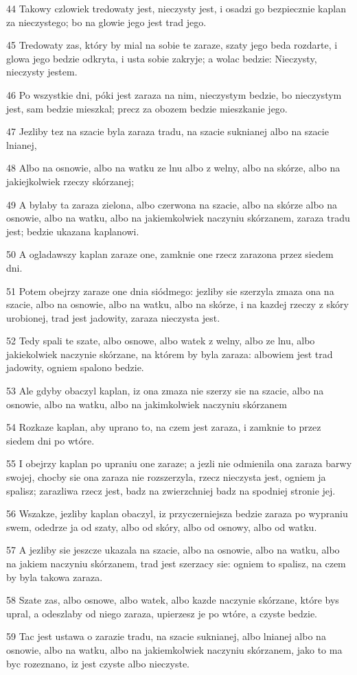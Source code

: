 \par 44 Takowy czlowiek tredowaty jest, nieczysty jest, i osadzi go bezpiecznie kaplan za nieczystego; bo na glowie jego jest trad jego.
\par 45 Tredowaty zas, który by mial na sobie te zaraze, szaty jego beda rozdarte, i glowa jego bedzie odkryta, i usta sobie zakryje; a wolac bedzie: Nieczysty, nieczysty jestem.
\par 46 Po wszystkie dni, póki jest zaraza na nim, nieczystym bedzie, bo nieczystym jest, sam bedzie mieszkal; precz za obozem bedzie mieszkanie jego.
\par 47 Jezliby tez na szacie byla zaraza tradu, na szacie suknianej albo na szacie lnianej,
\par 48 Albo na osnowie, albo na watku ze lnu albo z welny, albo na skórze, albo na jakiejkolwiek rzeczy skórzanej;
\par 49 A bylaby ta zaraza zielona, albo czerwona na szacie, albo na skórze albo na osnowie, albo na watku, albo na jakiemkolwiek naczyniu skórzanem, zaraza tradu jest; bedzie ukazana kaplanowi.
\par 50 A ogladawszy kaplan zaraze one, zamknie one rzecz zarazona przez siedem dni.
\par 51 Potem obejrzy zaraze one dnia siódmego: jezliby sie szerzyla zmaza ona na szacie, albo na osnowie, albo na watku, albo na skórze, i na kazdej rzeczy z skóry urobionej, trad jest jadowity, zaraza nieczysta jest.
\par 52 Tedy spali te szate, albo osnowe, albo watek z welny, albo ze lnu, albo jakiekolwiek naczynie skórzane, na którem by byla zaraza: albowiem jest trad jadowity, ogniem spalono bedzie.
\par 53 Ale gdyby obaczyl kaplan, iz ona zmaza nie szerzy sie na szacie, albo na osnowie, albo na watku, albo na jakimkolwiek naczyniu skórzanem
\par 54 Rozkaze kaplan, aby uprano to, na czem jest zaraza, i zamknie to przez siedem dni po wtóre.
\par 55 I obejrzy kaplan po upraniu one zaraze; a jezli nie odmienila ona zaraza barwy swojej, chocby sie ona zaraza nie rozszerzyla, rzecz nieczysta jest, ogniem ja spalisz; zarazliwa rzecz jest, badz na zwierzchniej badz na spodniej stronie jej.
\par 56 Wszakze, jezliby kaplan obaczyl, iz przyczerniejsza bedzie zaraza po wypraniu swem, odedrze ja od szaty, albo od skóry, albo od osnowy, albo od watku.
\par 57 A jezliby sie jeszcze ukazala na szacie, albo na osnowie, albo na watku, albo na jakiem naczyniu skórzanem, trad jest szerzacy sie: ogniem to spalisz, na czem by byla takowa zaraza.
\par 58 Szate zas, albo osnowe, albo watek, albo kazde naczynie skórzane, które bys upral, a odeszlaby od niego zaraza, upierzesz je po wtóre, a czyste bedzie.
\par 59 Tac jest ustawa o zarazie tradu, na szacie suknianej, albo lnianej albo na osnowie, albo na watku, albo na jakiemkolwiek naczyniu skórzanem, jako to ma byc rozeznano, iz jest czyste albo nieczyste.

